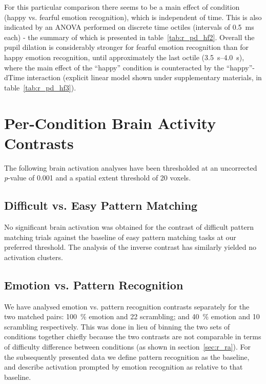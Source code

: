 	    For this particular comparison there seems to be a main effect of condition (happy vs. fearful emotion recognition), which is independent of time.
	    This is also indicated by an ANOVA performed on discrete time octiles (intervals of \SI{0.5}{\milli\second} each) - the summary of which is presented in table~\ref{tab:r_pd_hf2}.
	    Overall the pupil dilation is considerably stronger for fearful emotion recognition than for happy emotion recognition, until approximately the last octile (\SIrange{3.5}{4.0}{\second}), where the main effect of the “happy” condition is counteracted by the “happy”-dTime interaction (explicit linear model shown under supplementary materials, in table~\ref{tab:r_pd_hf3}).
	    
    \section{Per-Condition Brain Activity Contrasts}\label{sec:r_pc}
	The following brain activation analyses have been thresholded at an uncorrected \textit{p}-value of 0.001 and a spatial extent threshold of 20 voxels.
	\subsection{Difficult vs. Easy Pattern Matching}\label{sec:r_pc_ed}
	    No significant brain activation was obtained for the contrast of difficult pattern matching trials against the baseline of easy pattern matching tasks at our preferred threshold.
	    The analysis of the inverse contrast has similarly yielded no activation clusters.
	\subsection{Emotion vs. Pattern Recognition}\label{sec:r_pc_ep}
	    We have analysed emotion vs. pattern recognition contrasts separately for the two matched pairs: \SI{100}{\percent} emotion and \SI{22}{\pixel} scrambling; and \SI{40}{\percent} emotion and \SI{10}{\pixel} scrambling respectively.
	    This was done in lieu of binning the two sets of conditions together chiefly because the two contrasts are not comparable in terms of difficulty difference between conditions (as shown in section~\ref{sec:r_ra}).
	    For the subsequently presented data we define pattern recognition as the baseline, and describe activation prompted by emotion recognition as relative to that baseline.
